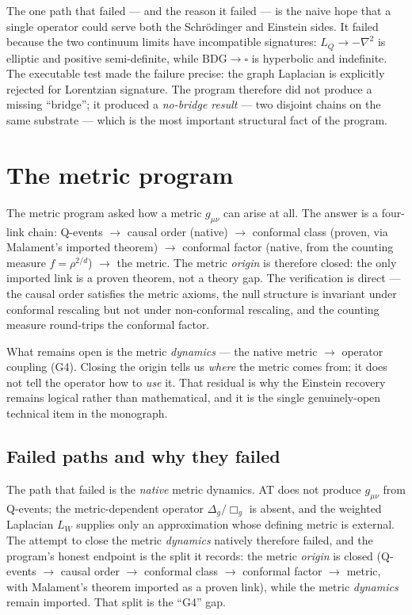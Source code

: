 \documentclass[10pt,twoside,openany]{book}
\begin{document}
The one path that failed --- and the reason it failed --- is the naive hope that a single
operator could serve both the Schr\"odinger and Einstein sides. It failed because the two
continuum limits have incompatible signatures: $L_Q\to-\nabla^2$ is elliptic and positive
semi-definite, while $\mathrm{BDG}\to\square$ is hyperbolic and indefinite. The executable
test made the failure precise: the graph Laplacian is explicitly rejected for Lorentzian
signature. The program therefore did not produce a missing ``bridge''; it produced a
\emph{no-bridge result} --- two disjoint chains on the same substrate --- which is the
most important structural fact of the program.

\section{The metric program}

The metric program asked how a metric $g_{\mu\nu}$ can arise at all. The answer is a
four-link chain: Q-events $\to$ causal order (native) $\to$ conformal class (proven, via
Malament's imported theorem) $\to$ conformal factor (native, from the counting measure
$f=\rho^{2/d}$) $\to$ the metric. The metric \emph{origin} is therefore closed: the only
imported link is a proven theorem, not a theory gap. The verification is direct --- the
causal order satisfies the metric axioms, the null structure is invariant under conformal
rescaling but not under non-conformal rescaling, and the counting measure round-trips the
conformal factor.

What remains open is the metric \emph{dynamics} --- the native metric $\to$ operator
coupling (G4). Closing the origin tells us \emph{where} the metric comes from; it does not
tell the operator how to \emph{use} it. That residual is why the Einstein recovery remains
logical rather than mathematical, and it is the single genuinely-open technical item in
the monograph.

\subsection{Failed paths and why they failed}

The path that failed is the \emph{native} metric dynamics. AT does not produce
$g_{\mu\nu}$ from Q-events; the metric-dependent operator $\Delta_g/\Box_g$ is absent, and
the weighted Laplacian $L_W$ supplies only an approximation whose defining metric is
external. The attempt to close the metric \emph{dynamics} natively therefore failed, and
the program's honest endpoint is the split it records: the metric \emph{origin} is closed
(Q-events $\to$ causal order $\to$ conformal class $\to$ conformal factor $\to$ metric,
with Malament's theorem imported as a proven link), while the metric \emph{dynamics} remain
imported. That split is the ``G4'' gap.
\end{document}
